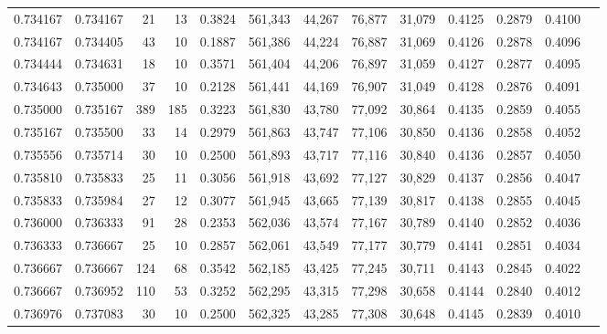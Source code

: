 \begin{tabular}{rrrrrrrrrrrrr}
0.734167 & 0.734167 &    21 &  13 &                                     0.3824 & 561,343 &  44,267 &  76,877 &  31,079 & 0.4125 & 0.2879 & 0.4100 \\
0.734167 & 0.734405 &    43 &  10 &                                     0.1887 & 561,386 &  44,224 &  76,887 &  31,069 & 0.4126 & 0.2878 & 0.4096 \\
0.734444 & 0.734631 &    18 &  10 &                                     0.3571 & 561,404 &  44,206 &  76,897 &  31,059 & 0.4127 & 0.2877 & 0.4095 \\
0.734643 & 0.735000 &    37 &  10 &                                     0.2128 & 561,441 &  44,169 &  76,907 &  31,049 & 0.4128 & 0.2876 & 0.4091 \\
0.735000 & 0.735167 &   389 & 185 &                                     0.3223 & 561,830 &  43,780 &  77,092 &  30,864 & 0.4135 & 0.2859 & 0.4055 \\
0.735167 & 0.735500 &    33 &  14 &                                     0.2979 & 561,863 &  43,747 &  77,106 &  30,850 & 0.4136 & 0.2858 & 0.4052 \\
0.735556 & 0.735714 &    30 &  10 &                                     0.2500 & 561,893 &  43,717 &  77,116 &  30,840 & 0.4136 & 0.2857 & 0.4050 \\
0.735810 & 0.735833 &    25 &  11 &                                     0.3056 & 561,918 &  43,692 &  77,127 &  30,829 & 0.4137 & 0.2856 & 0.4047 \\
0.735833 & 0.735984 &    27 &  12 &                                     0.3077 & 561,945 &  43,665 &  77,139 &  30,817 & 0.4138 & 0.2855 & 0.4045 \\
0.736000 & 0.736333 &    91 &  28 &                                     0.2353 & 562,036 &  43,574 &  77,167 &  30,789 & 0.4140 & 0.2852 & 0.4036 \\
0.736333 & 0.736667 &    25 &  10 &                                     0.2857 & 562,061 &  43,549 &  77,177 &  30,779 & 0.4141 & 0.2851 & 0.4034 \\
0.736667 & 0.736667 &   124 &  68 &                                     0.3542 & 562,185 &  43,425 &  77,245 &  30,711 & 0.4143 & 0.2845 & 0.4022 \\
0.736667 & 0.736952 &   110 &  53 &                                     0.3252 & 562,295 &  43,315 &  77,298 &  30,658 & 0.4144 & 0.2840 & 0.4012 \\
0.736976 & 0.737083 &    30 &  10 &                                     0.2500 & 562,325 &  43,285 &  77,308 &  30,648 & 0.4145 & 0.2839 & 0.4010 \\

\end{tabular}
